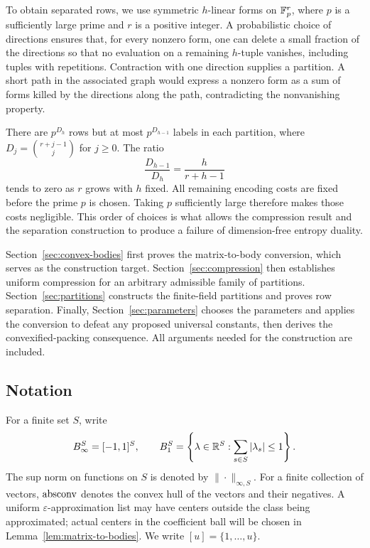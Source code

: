 To obtain separated rows, we use symmetric $h$-linear forms on
$\mathbb F_p^r$, where $p$ is a sufficiently large prime and $r$ is a positive
integer. A probabilistic choice of directions ensures that, for
every nonzero form, one can delete a small fraction of the directions
so that no evaluation on a remaining $h$-tuple vanishes, including
tuples with repetitions.
Contraction with one direction supplies a partition. A short path in the
associated graph would express a nonzero form as a sum of forms killed
by the directions along the path, contradicting the nonvanishing
property.

There are $p^{D_h}$ rows but at most $p^{D_{h-1}}$ labels in each
partition, where $D_j=\binom{r+j-1}{j}$ for $j\ge0$. The ratio
\[
 \frac{D_{h-1}}{D_h}=\frac{h}{r+h-1}
\]
tends to zero as $r$ grows with $h$ fixed. All remaining encoding costs
are fixed before the prime $p$ is chosen. Taking $p$ sufficiently large
therefore makes those costs negligible. This order of choices is what
allows the compression result and the separation construction to
produce a failure of dimension-free entropy duality.

Section~\ref{sec:convex-bodies} first proves the matrix-to-body conversion,
which serves as the construction target. Section~\ref{sec:compression}
then establishes uniform compression for an arbitrary admissible family
of partitions. Section~\ref{sec:partitions} constructs the finite-field
partitions and proves row separation. Finally, Section~\ref{sec:parameters}
chooses the parameters and applies the conversion to defeat any proposed
universal constants, then derives the convexified-packing consequence.
All arguments needed for the construction are included.

\subsection{Notation}

For a finite set $S$, write
\[
 B_\infty^S=[-1,1]^S,\qquad
 B_1^S=\left\{\lambda\in\mathbb R^S:
                   \sum_{s\in S}|\lambda_s|\le1\right\}.
\]
The sup norm on functions on $S$ is denoted by $\|\cdot\|_{\infty,S}$.
For a finite collection of vectors, $\operatorname{absconv}$ denotes the convex hull
of the vectors and their negatives. A uniform $\varepsilon$-approximation
list may have centers outside the class being approximated; actual
centers in the coefficient ball will be chosen in
Lemma~\ref{lem:matrix-to-bodies}. We write $[u]=\{1,\ldots,u\}$.
